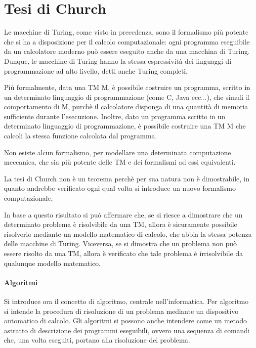   \section{Tesi di Church}
  Le macchine di Turing, come visto in precedenza, sono il formalismo più potente che si ha a disposizione per il calcolo computazionale: ogni programma eseguibile da un calcolatore moderno può essere eseguito anche da una macchina di Turing. Dunque, le macchine di Turing hanno la stessa espressività dei linguaggi di programmazione ad alto livello, detti anche Turing completi. 

  Più formalmente, data una TM M, è possibile costruire un programma, scritto in un determinato linguaggio di programmazione (come C, Java ecc...), che simuli il comportamento di M, purchè il calcolatore disponga di una quantità di memoria sufficiente durante l'esecuzione. Inoltre, dato un programma scritto in un determinato linguaggio di programmazione, è possibile costruire una TM M che calcoli la stessa funzione calcolata dal programma.

  \begin{thesis}
    Non esiste alcun formalismo, per modellare una determinata computazione meccanica, che sia più potente delle TM e dei formalismi ad essi equivalenti.
  \end{thesis}

  La tesi di Church non è un teorema perchè per sua natura non è dimostrabile, in quanto andrebbe verificato ogni qual volta si introduce un nuovo formalismo computazionale.

  In base a questo risultato si può affermare che, se si riesce a dimostrare che un determinato problema è risolvibile da una TM, allora è sicuramente possibile risolverlo mediante un modello matematico di calcolo, che abbia la stessa potenza delle macchine di Turing. Viceversa, se si dimostra che un problema non può essere risolto da una TM, allora è verificato che tale problema è irrisolvibile da qualunque modello matematico.

  \paragraph{Algoritmi}
  Si introduce ora il concetto di algoritmo, centrale nell'informatica. Per algoritmo si intende la procedura di risoluzione di un problema mediante un dispositivo automatico di calcolo. Gli algoritmi si possono anche intendere come un metodo astratto di descrizione dei programmi eseguibili, ovvero una sequenza di comandi che, una volta eseguiti, portano alla risoluzione del problema.
  

